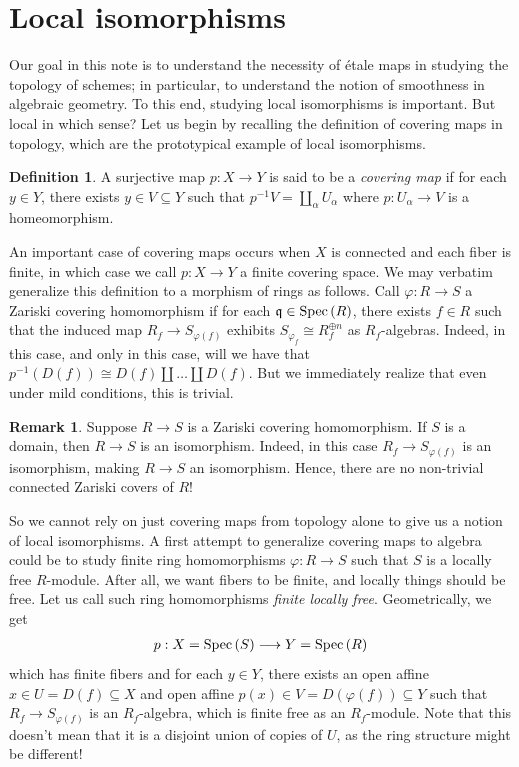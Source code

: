 \documentclass[letterpaper,10pt,twoside]{amsart}
\newcommand{\spec}[1]{{\fontfamily{lmss}\selectfont 
		\text{\rm Spec}\left(#1\right )
}}
\newcommand{\isom}{\cong}
\newcommand{\ideal}[1]{\mathfrak{#1}}
\theoremstyle{proposition}
\theoremstyle{definition}
\newtheorem{definition}[proposition]{Definition}
\theoremstyle{theorem}
\theoremstyle{definition}
\newtheorem{remark}[proposition]{\textbf{Remark}}
\theoremstyle{definition}
\theoremstyle{definition}
\theoremstyle{lemma}
\theoremstyle{definition}
\theoremstyle{definition}
\theoremstyle{corollary}
\theoremstyle{definition}
\begin{document}
	\section{Local isomorphisms}
	Our goal in this note is to understand the necessity of \'etale maps in studying the topology of schemes; in particular, to understand the notion of smoothness in algebraic geometry. To this end, studying local isomorphisms is important. But local in which sense? Let us begin by recalling the definition of covering maps in topology, which are the prototypical example of local isomorphisms.
	\begin{definition}
		A surjective map $p : X\to Y$ is said to be a \textit{covering map} if for each $y\in Y$, there exists $y\in V\subseteq Y$ such that $p^{-1}V = \amalg_{\alpha} U_{\alpha}$ where $p : U_\alpha \to V$ is a homeomorphism. 
	\end{definition}
	An important case of covering maps occurs when $X$ is connected and each fiber is finite, in which case we call $p : X\to Y$ a finite covering space. We may verbatim generalize this definition to a morphism of rings as follows. Call $\varphi : R\to S$ a Zariski covering homomorphism if for each $\ideal{q} \in \spec{R}$, there exists $f\in R$ such that the induced map $R_f \to S_{\varphi(f)}$ exhibits $S_{\varphi_{f}} \isom R_f^{\oplus n}$ as $R_f$-algebras. Indeed, in this case, and only in this case, will we have that $p^{-1}(D(f)) \isom D(f) \amalg \dots \amalg D(f) $. But we immediately realize that even under mild conditions, this is trivial.
	\begin{remark}
		Suppose $R\to S$ is a Zariski covering homomorphism. If $S$ is a domain, then $R\to S$ is an isomorphism. Indeed, in this case $R_f \to S_{\varphi(f)} $ is an isomorphism, making $R\to S$ an isomorphism. Hence, there are no non-trivial connected Zariski covers of $R$!
	\end{remark}
	So we cannot rely on just covering maps from topology alone to give us a notion of local isomorphisms. A first attempt to generalize covering maps to algebra could be to study finite ring homomorphisms $\varphi : R\to S$ such that $S$ is a locally free $R$-module. After all, we want fibers to be finite, and locally things should be free.  Let us call such ring homomorphisms \textit{finite locally free}. Geometrically, we get
	\begin{align*}
		p : X = \spec{S} \longrightarrow Y = \spec{R}
	\end{align*}
	which has finite fibers and for each $y\in Y$, there exists an open affine $x\in U = D(f)\subseteq X$ and open affine $p(x) \in V=D(\varphi(f))\subseteq Y$ such that $R_f \to S_{\varphi(f)}$ is an $R_f$-algebra, which is finite free as an $R_f$-module. Note that this doesn't mean that it is a disjoint union of copies of $U$, as the ring structure might be different!\\\indent
\end{document}
